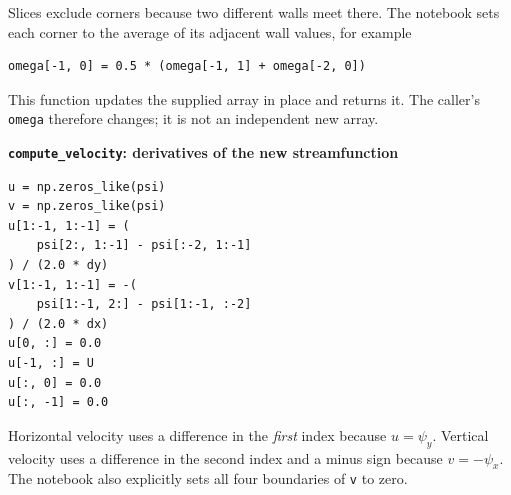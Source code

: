 Slices exclude corners because two different walls meet there. The notebook sets each corner to the average of its adjacent wall values, for example
\begin{lstlisting}
omega[-1, 0] = 0.5 * (omega[-1, 1] + omega[-2, 0])
\end{lstlisting}
This function updates the supplied array in place and returns it. The caller's \texttt{omega} therefore changes; it is not an independent new array.

\textbf{\texttt{compute\_velocity}: derivatives of the new streamfunction}
\begin{lstlisting}
u = np.zeros_like(psi)
v = np.zeros_like(psi)
u[1:-1, 1:-1] = (
    psi[2:, 1:-1] - psi[:-2, 1:-1]
) / (2.0 * dy)
v[1:-1, 1:-1] = -(
    psi[1:-1, 2:] - psi[1:-1, :-2]
) / (2.0 * dx)
u[0, :] = 0.0
u[-1, :] = U
u[:, 0] = 0.0
u[:, -1] = 0.0
\end{lstlisting}
Horizontal velocity uses a difference in the \emph{first} index because $u=\psi_y$. Vertical velocity uses a difference in the second index and a minus sign because $v=-\psi_x$. The notebook also explicitly sets all four boundaries of \texttt{v} to zero.

